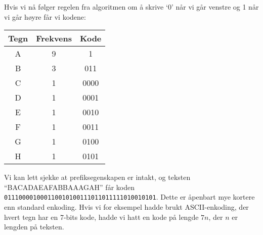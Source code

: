 \begin{example}
			Hvis vi nå følger regelen fra algoritmen om å skrive `0' når vi går venstre og 1 når vi går høyre får vi kodene:
			\begin{center}
				\begin{tabular}{c c c}
					Tegn & Frekvens & Kode \\
					\hline
					A & 9 & 1\\
					B & 3 & 011\\
					C & 1 & 0000\\
					D & 1 & 0001\\
					E & 1 & 0010\\
					F & 1 & 0011\\
					G & 1 & 0100\\
					H & 1 & 0101
				\end{tabular}
			\end{center}
			Vi kan lett sjekke at prefiksegenskapen er intakt, og teksten ``BACADAEAFABBAAAGAH'' får koden \verb|011100001000110010100111011011111010010101|. Dette er åpenbart mye kortere enn standard enkoding. Hvis vi for eksempel hadde brukt ASCII-enkoding, der hvert tegn har en 7-bits kode, hadde vi hatt en kode på lengde $7n$, der $n$ er lengden på teksten.
			\end{example}